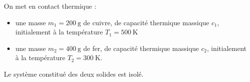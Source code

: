 \newpage



\hauteurLargeurCadreReponse		{10mm}{6cm}
\typeEntrainement				{} %
\initialisationEntrainement

On met en contact thermique :
\begin{itemize}
\item une masse $m_1=\SI{200}{\gram}$ de cuivre, de capacité thermique massique $c_1$,
initialement à la température $T_1 =\SI{500}{\kelvin}$ 
\item une masse $m_2 =\SI{400}{\gram}$ de fer, de capacité thermique
massique $c_2$, initialement à la température $T_2 =\SI{300}{\kelvin}$. 
\end{itemize}
Le système constitué des deux solides est isolé.

\medskip


\debutEntrainement


